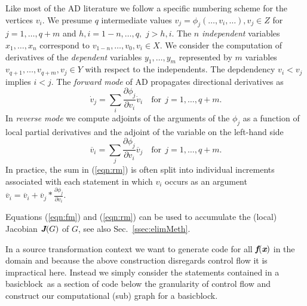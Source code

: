 \documentclass[11pt]{article}
\newcommand{\basicblock}{basicblock}
\newcommand{\bmf}{\mbox{\bf\em f}}
\newcommand{\bmJ}{\mbox{\bf\em J}}
\newcommand{\bmx}{\mbox{\bf\em x}}
\newcommand{\refsec}[1]{{Sec.~\ref{#1}}}
\newcommand{\refeqn}[1]{{(\ref{#1})}}
\begin{document}
Like most of the AD literature we follow a specific numbering scheme for the vertices $v_i$.
We presume $q$ intermediate values
$v_j = \phi_j(\ldots,v_i,\ldots), v_j\in Z$
for $j=1,\ldots,q+m$ and $h,i=1-n,\ldots,q,$ $j>h,i$. 
The $n$ {\em independent}
variables $x_1,\ldots,x_n$ correspond to 
$v_{1-n},\ldots,v_0, v_i\in X$. 
We consider the 
computation of derivatives of the {\em dependent} variables 
$y_1,\ldots,y_m$ represented by $m$ variables $v_{q+1},\ldots,v_{q+m}, v_j\in Y$
with respect to the independents. 
The depdendency $v_i<v_j$ implies $i<j$. 
The {\em forward mode} of AD propagates directional derivatives
as 
\begin{equation} \label{eqn:fm}
  \dot{v}_j= \sum\limits_i\frac{\partial \phi_j}{\partial v_i}\dot{v}_i 
  \quad \text{for}~~j=1,\ldots,q+m.
\end{equation} 
In {\em reverse mode} we compute adjoints of the arguments of the $\phi_j$
as a function of local partial derivatives and the 
adjoint of the variable on the left-hand side
\begin{equation} \label{eqn:rm}
  \overline{v}_i= \sum\limits_j\frac{\partial \phi_j}{\partial v_i}\overline{v}_j 
  \quad \text{for}~~j=1,\ldots,q+m.
\end{equation} 
In practice, the sum in \refeqn{eqn:rm} is often split into individual increments 
associated with each statement in which $v_i$ occurs as an argument 
$\overline{v}_i=\overline{v}_i+\overline{v}_j * \frac{\partial \phi_j}{\partial v_i}$.

Equations \refeqn{eqn:fm} and \refeqn{eqn:rm} can be used to accumulate 
the (local) Jacobian $\bmJ(G)$
of $G$, see also \refsec{ssec:elimMeth}. 

In a source transformation context we want to generate code for all $\bmf(\bmx)$
in the domain and because the above construction disregards control flow it is 
impractical here. Instead we simply consider the statements contained in a 
\basicblock\  as a section of code below the granularity of control flow and 
construct our computational (sub) graph for a \basicblock.   

\end{document}
